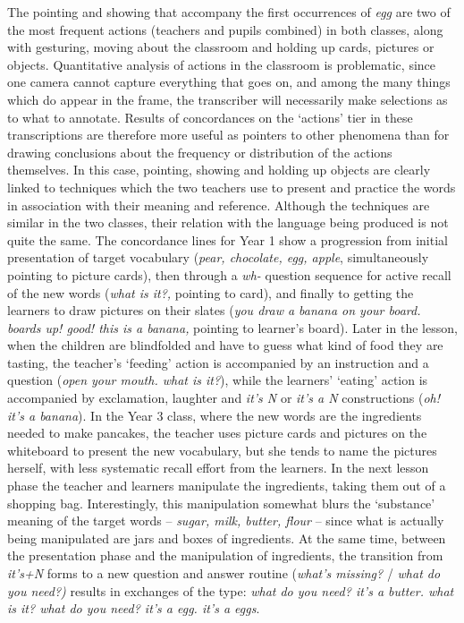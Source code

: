 \documentclass[11pt]{article}
\newenvironment{styleStandard}{\renewcommand\baselinestretch{1.25}\setlength\leftskip{0cm}\setlength\rightskip{0cm plus 1fil}\setlength\parindent{0cm}\setlength\parfillskip{0pt plus 1fil}\setlength\parskip{0in plus 1pt}\writerlistparindent\writerlistleftskip\leavevmode\normalfont\normalsize\writerlistlabel\ignorespaces}{\unskip\vspace{0.139in plus 0.0139in}\par}
\newcommand\writerlistleftskip{}
\newcommand\writerlistparindent{}
\newcommand\writerlistlabel{}
\begin{document}
\begin{styleStandard}
The pointing and showing that accompany the first occurrences of \textit{egg} are two of the most frequent actions (teachers and pupils combined) in both classes, along with gesturing, moving about the classroom and holding up cards, pictures or objects. Quantitative analysis of actions in the classroom is problematic, since one camera cannot capture everything that goes on, and among the many things which do appear in the frame, the transcriber will necessarily make selections as to what to annotate. Results of concordances on the ‘actions’ tier in these transcriptions are therefore more useful as pointers to other phenomena than for drawing conclusions about the frequency or distribution of the actions themselves. In this case, pointing, showing and holding up objects are clearly linked to techniques which the two teachers use to present and practice the words in association with their meaning and reference. Although the techniques are similar in the two classes, their relation with the language being produced is not quite the same. The concordance lines for Year 1 show a progression from initial presentation of target vocabulary (\textit{pear, chocolate, egg, apple}, simultaneously pointing to picture cards), then through a \textit{wh-} question sequence for active recall of the new words (\textit{what is it?,} pointing to card), and finally to getting the learners to draw pictures on their slates (\textit{you draw a banana on your board. boards up! good! this is a banana,} pointing to learner’s board). Later in the lesson, when the children are blindfolded and have to guess what kind of food they are tasting, the teacher’s ‘feeding’ action is accompanied by an instruction and a question (\textit{open your mouth. what is it?}), while the learners’ ‘eating’ action is accompanied by exclamation, laughter and \textit{it’s N} or \textit{it’s a N} constructions (\textit{oh! it’s a banana}). In the Year 3 class, where the new words are the ingredients needed to make pancakes, the teacher uses picture cards and pictures on the whiteboard to present the new vocabulary, but she tends to name the pictures herself, with less systematic recall effort from the learners. In the next lesson phase the teacher and learners manipulate the ingredients, taking them out of a shopping bag. Interestingly, this manipulation somewhat blurs the ‘substance’ meaning of the target words – \textit{sugar, milk, butter, flour} – since what is actually being manipulated are jars and boxes of ingredients. At the same time, between the presentation phase and the manipulation of ingredients, the transition from \textit{it’s+N} forms to a new question and answer routine (\textit{what’s missing?} / \textit{what do you need?)} results in exchanges of the type: \textit{what do you need? it’s a butter. what is it? what do you need? it’s a egg. it’s a eggs}. 
\end{styleStandard}
\end{document}
